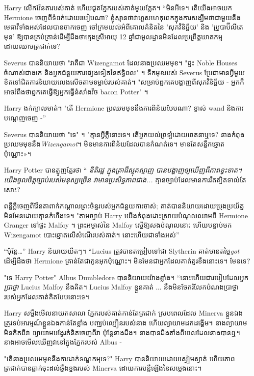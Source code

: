 {{{Harry លើកវ៉ែនតារបស់គាត់ ហើយជូតភ្នែករបស់គាត់មួយភ្លែត។ “មិនអីទេ។ តើយើងអាចយក Hermione ចេញពីទំពក់ដោយរបៀបណា? ខ្ញុំស្មានថាវាហួសហេតុពេកក្នុងការសង្ឃឹមថាជាមួយនឹងមេធាវីទាំងអស់ដែលបានចាកចេញ ចៅក្រមយល់អំពីគោលគំនិតនៃ 'សុភវិនិច្ឆ័យ' និង 'ប្រូបាប៊ីលីតេមុន' ឱ្យបានគ្រប់គ្រាន់ដើម្បីដឹងថាក្មេងស្រីអាយុ 12 ឆ្នាំជាមូលដ្ឋានមិនដែលប្រព្រឹត្តឃាតកម្មដោយឈាមត្រជាក់ទេ?

Severus បាននិយាយថា "វាគឺជា Wizengamot ដែលនាងប្រឈមមុខ។ "ផ្ទះ Noble Houses ចំណាស់ជាងគេ និងអ្នកជំនួយការផ្សេងទៀតនៃឥទ្ធិពល" ។ ទឹកមុខរបស់ Severus ប្រែជាមានអ្វីមួយ ខិតទៅជិតការនិយាយលេងសើចតាមទម្លាប់របស់គាត់។ "សម្រាប់ពួកគេបង្ហាញពីសុភវិនិច្ឆ័យ - អ្នកក៏អាចរំពឹងថាពួកគេធ្វើឱ្យអ្នកធ្វើនំសាំងវិច bacon Potter" ។

Harry ងក់​ក្បាល​មាត់​។ "តើ Hermione ប្រឈមមុខនឹងការពិន័យបែបណា? ខ្ទាស់ wand និងការបណ្តេញចេញ -”

Severus បាននិយាយថា "ទេ" ។ "គ្មានអ្វីភ្លឺនោះទេ។ តើ​អ្នក​យល់​ច្រឡំ​ដោយ​ចេតនា​ឬ​ទេ? នាងកំពុងប្រឈមមុខនឹង\emph{Wizengamot}។ មិនមានការពិន័យដែលបានកំណត់ទេ។ មាន​តែ​សន្លឹក​ឆ្នោត​ប៉ុណ្ណោះ»។

Harry Potter បានត្អូញត្អែរថា “\emph{ នីតិរដ្ឋ ក្នុងគ្រាដ៏ស្មុគស្មាញ បានបង្ហាញឲ្យឃើញពីភាពខ្វះខាត។ យើង​ចូលចិត្ត​ច្បាប់​របស់​មនុស្ស​ច្រើន វា​មាន​ប្រសិទ្ធភាព​ជាង...} គ្មាន​ច្បាប់​ដែល​មាន​ការ​រឹតត្បិត​ទាល់​តែ​សោះ?

ពន្លឺភ្លឺចេញពីវ៉ែនតាពាក់កណ្តាលព្រះច័ន្ទរបស់អ្នកជំនួយការចាស់; គាត់បាននិយាយដោយប្រុងប្រយ័ត្ន មិនមែនដោយគ្មានកំហឹងទេ។ "តាមច្បាប់ Harry យើងកំពុងដោះស្រាយបំណុលឈាមពី Hermione Granger ទៅផ្ទះ Malfoy ។ ព្រះអម្ចាស់នៃ Malfoy ស្នើឱ្យសងបំណុលនោះ ហើយបន្ទាប់មក Wizengamot បោះឆ្នោតលើសំណើរបស់គាត់។ នោះហើយជាទាំងអស់”

“ប៉ុន្តែ…” Harry និយាយយឺតៗ។ “Lucius ត្រូវបានតម្រៀបទៅជា Slytherin គាត់មានតម្លៃ\emph{got} ដើម្បីដឹងថា Hermione គ្រាន់តែជាកូនអុកប៉ុណ្ណោះ។ មិនមែនជាអ្នកដែលគាត់គួរខឹងនោះទេ។ មែនទេ?

"ទេ Harry Potter" Albus Dumbledore បាននិយាយយ៉ាងខ្លាំង។ “នោះហើយជារបៀបដែលអ្នក \emph{ប្រាថ្នា} Lucius Malfoy នឹងគិត។ Lucius Malfoy ខ្លួនគាត់ ... នឹងមិនចែករំលែកបំណងប្រាថ្នារបស់អ្នកដែលគាត់គិតបែបនោះទេ។

Harry សម្លឹងមើលនាយកសាលា ភ្នែករបស់គាត់កាន់តែត្រជាក់ ស្របពេលដែល Minerva ខ្លួនឯងត្រូវទប់អារម្មណ៍ខ្លួនឯងកាន់តែខ្លាំង បញ្ឈប់ល្បឿនរបស់នាង ហើយព្យាយាមដកដង្ហើម។ នាងព្យាយាមមិនគិតពីវា ព្យាយាមបង្វែរគំនិតចេញពីវា ប៉ុន្តែនាងដឹង។ នាង​បាន​ដឹង​តាំង​ពី​ពេល​ដែល​នាង​បាន​ឮ។ នាងអាចមើលឃើញវានៅក្នុងភ្នែករបស់ Albus -

"តើនាងប្រឈមមុខនឹងការដាក់ទណ្ឌកម្មទេ?" Harry បាននិយាយដោយស្ងៀមស្ងាត់ ហើយភាពត្រជាក់បានធ្លាក់ចុះដល់ឆ្អឹងខ្នងរបស់ Minerva ដោយការបន្លឺឡើងនៃសម្លេងនោះ។

}}}

